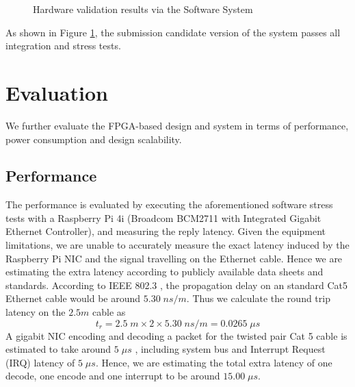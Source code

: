 \documentclass[a4paper]{report}
\begin{document}
\begin{figure}[H]
  \caption{Hardware validation results via the Software System}
  \label{fig:hardware-validation-results}
\end{figure}

As shown in Figure \ref{fig:hardware-validation-results}, the submission candidate version of the system passes all integration and stress tests.

\section{Evaluation}

We further evaluate the FPGA-based design and system in terms of performance, power consumption and design scalability.

\subsection{Performance}

The performance is evaluated by executing the aforementioned software stress tests with a Raspberry Pi 4i (Broadcom BCM2711 with Integrated Gigabit Ethernet Controller), and measuring the reply latency. Given the equipment limitations, we are unable to accurately measure the exact latency induced by the Raspberry Pi NIC and the signal travelling on the Ethernet cable. Hence we are estimating the extra latency according to publicly available data sheets and standards. According to IEEE 802.3 \cite{ieee802.3ethernet-2018}, the propagation delay on an standard Cat5 Ethernet cable would be around $5.30 \; ns/m$. Thus we calculate the round trip latency on the $2.5m$ cable as  
$$
t_r = 2.5\; m \times 2 \times 5.30\; ns /m = 0.0265 \; \mu s
$$ 
A gigabit NIC encoding and decoding a packet for the twisted pair Cat 5 cable is estimated to take around $5 \; \mu s$ \cite{texas-instruments-dp83848x}, including system bus and Interrupt Request (IRQ) latency of $5 \; \mu s$. Hence, we are estimating the total extra latency of one decode, one encode and one interrupt to be around $15.00\; \mu s$.
\end{document}

